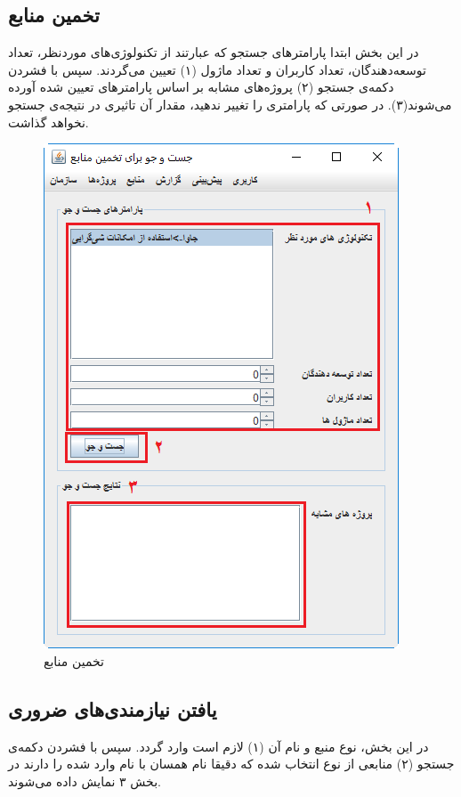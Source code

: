 \subsection{تخمین منابع}
در این بخش ابتدا پارامترهای جستجو که عبارتند از تکنولوژی‌های موردنظر، تعداد توسعه‌دهندگان، تعداد کاربران و تعداد ماژول (۱) تعیین می‌گردند. سپس با فشردن دکمه‌ی جستجو (۲) پروژه‌های مشابه بر اساس پارامترهای تعیین شده آورده می‌شوند(۳).
در صورتی که پارامتری را تغییر ندهید، مقدار آن تاثیری در نتیجه‌ی جستجو نخواهد گذاشت.
	\begin{figure}[H]
		\centering
		\includegraphics[scale=0.7]{img/manual/searchRes}
		\caption{تخمین منابع}
	\end{figure}

\subsection{یافتن نیازمندی‌های ضروری}
در این بخش، نوع منبع و نام آن (۱) لازم است وارد گردد. سپس با فشردن دکمه‌ی جستجو (۲) منابعی از نوع انتخاب شده که دقیقا نام همسان با نام وارد شده را دارند در بخش ۳ نمایش داده می‌شوند. 

